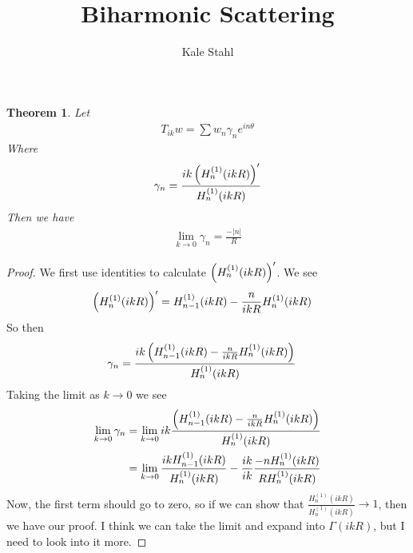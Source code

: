 \documentclass[]{article}
\title{Biharmonic Scattering}
\author{Kale Stahl}
\newtheorem{theorem}{Theorem}
\numberwithin{equation}{problem}
\begin{document}
	
	\maketitle
	
	\begin{theorem}
		Let
		\begin{align}
			T_{ik}w = \sum w_n\gamma_ne^{in\theta}
		\end{align}
		Where
		\begin{align}
			\gamma_n = \frac{ik\left( {H^{(1)}_n(ikR)} \right)^\prime}{H^{(1)}_n(ikR)}
		\end{align}
		Then we have 
		\begin{align}
			\lim_{k\to 0}\gamma_n = \frac{-|n|}{R}
		\end{align}
	\end{theorem}
	\begin{proof}
		We first use identities to calculate $\left( {H^{(1)}_n(ikR)} \right)^\prime$. We see
		\begin{align}
			\left( {H^{(1)}_n(ikR)} \right)^\prime &= H^{(1)}_{n-1}(ikR)- \frac{n}{ikR}H^{(1)}_n(ikR)
		\end{align}
		So then 
		\begin{align}
			\gamma_n &= \frac{ik\left( {H^{(1)}_{n-1}(ikR)- \frac{n}{ikR}H^{(1)}_n(ikR)} \right)}{H^{(1)}_n(ikR)}
		\end{align}
		Taking the limit as $k\to 0$ we see
		\begin{align}
			\lim_{k\to 0}\gamma_n &= \lim_{k\to 0}ik\frac{\left( {H^{(1)}_{n-1}(ikR)- \frac{n}{ikR}H^{(1)}_n(ikR)} \right)}{H^{(1)}_n(ikR)}\\
			 &= \lim_{k\to 0}\frac{ikH^{(1)}_{n-1}(ikR)}{H^{(1)}_n(ikR)} - \frac{ik}{ik}\frac{- nH^{(1)}_n(ikR)}{RH^{(1)}_n(ikR)}
		\end{align}
		Now, the first term should go to zero, so if we can show that $\frac{H^{(1)}_n(ikR)}{H^{(1)}_n(ikR)} \to 1$, then we have our proof. I think we can take the limit and expand into $\Gamma(ikR)$, but I need to look into it more.
	\end{proof}

	
\end{document}
